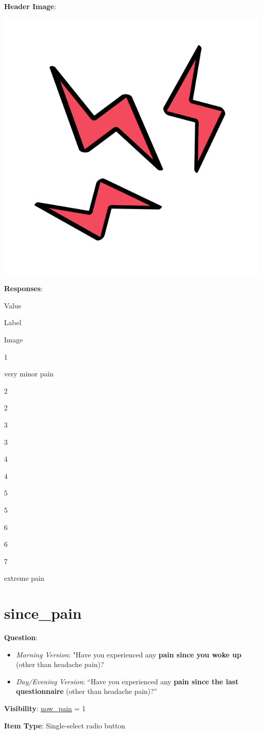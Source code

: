 \documentclass[]{book}
\providecommand{\tightlist}{%
  \setlength{\itemsep}{0pt}\setlength{\parskip}{0pt}}
\begin{document}
\textbf{Header Image}:

\begin{flushleft}\includegraphics[width=0.33\linewidth]{downloadFigs4latex_NIMH_Applet_Codebook/now_pain_level_headerImg} \end{flushleft}

\textbf{Responses}:

Value

Label

Image

1

very minor pain

2

2

3

3

4

4

5

5

6

6

7

extreme pain

\hypertarget{since_pain}{%
\section{since\_pain}\label{since_pain}}

\textbf{Question}:

\begin{itemize}
\tightlist
\item
  \emph{Morning Version}: "Have you experienced any \textbf{pain since you woke up} (other than headache pain)?
\item
  \emph{Day/Evening Version}: ``Have you experienced any \textbf{pain since the last questionnaire} (other than headache pain)?''
\end{itemize}

\textbf{Visibility}: \protect\hyperlink{now_pain}{now\_pain} = 1

\textbf{Item Type}: Single-select radio button
\end{document}
